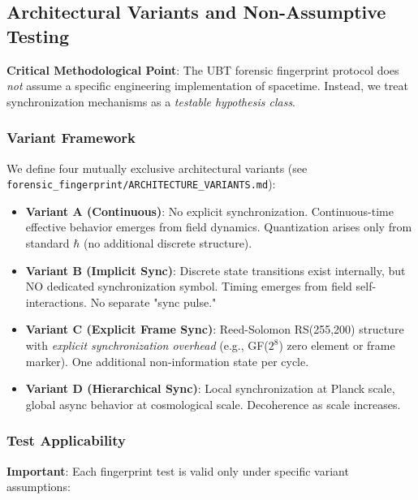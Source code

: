 \subsection{Architectural Variants and Non-Assumptive Testing}

\textbf{Critical Methodological Point}: The UBT forensic fingerprint protocol does \emph{not} assume a specific engineering implementation of spacetime. Instead, we treat synchronization mechanisms as a \emph{testable hypothesis class}.

\subsubsection{Variant Framework}

We define four mutually exclusive architectural variants (see \texttt{forensic\_fingerprint/ARCHITECTURE\_VARIANTS.md}):

\begin{itemize}
\item \textbf{Variant A (Continuous)}: No explicit synchronization. Continuous-time effective behavior emerges from field dynamics. Quantization arises only from standard $\hbar$ (no additional discrete structure).

\item \textbf{Variant B (Implicit Sync)}: Discrete state transitions exist internally, but NO dedicated synchronization symbol. Timing emerges from field self-interactions. No separate "sync pulse."

\item \textbf{Variant C (Explicit Frame Sync)}: Reed-Solomon RS(255,200) structure with \emph{explicit synchronization overhead} (e.g., GF($2^8$) zero element or frame marker). One additional non-information state per cycle.

\item \textbf{Variant D (Hierarchical Sync)}: Local synchronization at Planck scale, global async behavior at cosmological scale. Decoherence as scale increases.
\end{itemize}

\subsubsection{Test Applicability}

\textbf{Important}: Each fingerprint test is valid only under specific variant assumptions:

